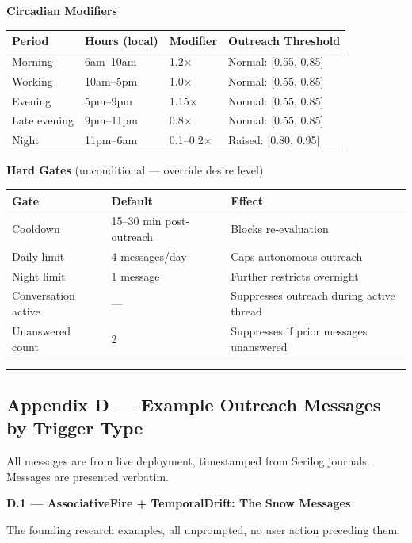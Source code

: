 \documentclass[12pt]{article}
\begin{document}
\textbf{Circadian Modifiers}

\begin{longtable}[]{@{}llll@{}}
\toprule\noalign{}
Period & Hours (local) & Modifier & Outreach Threshold \\
\midrule\noalign{}
\endhead
\bottomrule\noalign{}
\endlastfoot
Morning & 6am--10am & 1.2$\times$ & Normal: {[}0.55, 0.85{]} \\
Working & 10am--5pm & 1.0$\times$ & Normal: {[}0.55, 0.85{]} \\
Evening & 5pm--9pm & 1.15$\times$ & Normal: {[}0.55, 0.85{]} \\
Late evening & 9pm--11pm & 0.8$\times$ & Normal: {[}0.55, 0.85{]} \\
Night & 11pm--6am & 0.1--0.2$\times$ & Raised: {[}0.80, 0.95{]} \\
\end{longtable}

\textbf{Hard Gates} (unconditional --- override desire level)

\begin{longtable}[]{@{}lll@{}}
\toprule\noalign{}
Gate & Default & Effect \\
\midrule\noalign{}
\endhead
\bottomrule\noalign{}
\endlastfoot
Cooldown & 15--30 min post-outreach & Blocks re-evaluation \\
Daily limit & 4 messages/day & Caps autonomous outreach \\
Night limit & 1 message & Further restricts overnight \\
Conversation active & --- & Suppresses outreach during active thread \\
Unanswered count & 2 & Suppresses if prior messages unanswered \\
\end{longtable}

\begin{center}\rule{0.5\linewidth}{0.5pt}\end{center}

%
\subsection*{Appendix D --- Example Outreach Messages by Trigger
Type}

All messages are from live deployment, timestamped from Serilog
journals. Messages are presented verbatim.

\textbf{D.1 --- AssociativeFire + TemporalDrift: The Snow Messages}

The founding research examples, all unprompted, no user action preceding
them.
\end{document}
